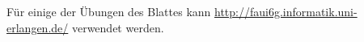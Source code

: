 \begin{note}
Für einige der Übungen des Blattes kann \url{http://faui6g.informatik.uni-erlangen.de/} verwendet werden.
\end{note}